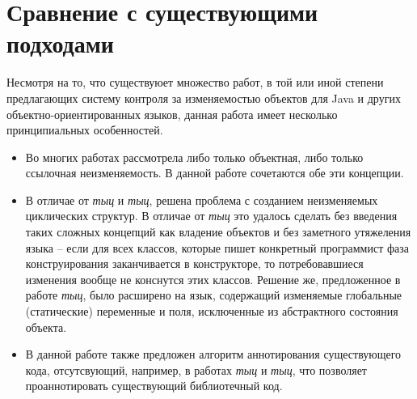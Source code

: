 \section{Сравнение с существующими подходами}

Несмотря на то, что существуюет множество работ, в той или иной степени предлагающих систему контроля за изменяемостью объектов для Java и других объектно-ориентированных языков, данная работа имеет несколько принципиальных особенностей. 

\begin{itemize}
	\item Во многих работах рассмотрела либо только объектная, либо только ссылочная неизменяемость. В данной работе сочетаются обе эти концепции.
	\item В отличае от \textit{тыц} и \textit{тыц}, решена проблема с созданием неизменяемых циклических структур. В отличае от \textit{тыц} это удалось сделать без введения таких сложных концепций как владение объектов и без заметного утяжеления языка -- если для всех классов, которые пишет конкретный программист фаза конструирования заканчивается в конструкторе, то потребовавшиеся изменения вообще не конснутся этих классов. Решение же, предложенное в работе \textit{тыц}, было расширено на язык, содержащий изменяемые глобальные (статические) переменные и поля, исключенные из абстрактного состояния объекта.
	\item В данной работе также предложен алгоритм аннотирования существующего кода, отсутсвующий, например, в работах \textit{тыц} и \textit{тыц}, что позволяет проаннотировать существующий библиотечный код.  
\end{itemize}

























